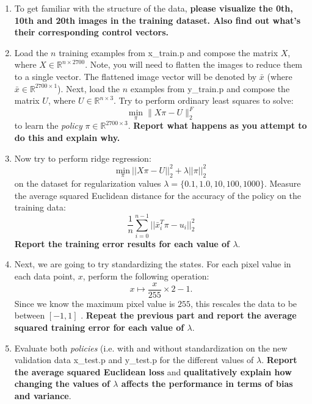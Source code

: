 \documentclass{article}\usepackage[utf8]{inputenc}\usepackage[margin=0.4cm,top=0.4cm,bottom=0.4cm]{geometry}\usepackage[usenames,dvipsnames,svgnames,table]{xcolor}
\begin{document}
\begin{enumerate}
\item To get familiar with the structure of the data, \textbf{please visualize the 0th, 10th and 20th images in the training dataset. Also find out what's their corresponding control vectors. }
\BeginSolution

\EndSolution
\item Load the $n$ training examples from x\_train.p and compose the matrix $X$, where $X \in \mathbb{R}^{n\times 2700}$. Note, you will need to flatten the images to reduce them to a single vector. The flattened image vector will be denoted by $\bar{x}$ (where $\bar{x} \in \mathbb{R}^{2700\times 1}$). Next, load the $n$ examples from y\_train.p and compose the matrix $U$, where $U \in \mathbb{R}^{n\times 3}$. Try to perform ordinary least squares to solve:  $$\min_{\pi} \|X\pi-U \|^F_2$$ to learn the \emph{policy} $\pi \in \mathbb{R}^{2700 \times 3}$. {\bf Report what happens as you attempt to do this and explain why.}
\BeginSolution

\EndSolution
\item Now try to perform ridge regression: $$\underset{\pi}{\mbox{min}} \: ||X\pi-U||^2_2 + \lambda ||\pi||^2_2$$ on the dataset for regularization values $\lambda = \lbrace 0.1,1.0,10,100,1000 \rbrace$. Measure the average squared Euclidean distance for the accuracy of the policy on the training data: $$\frac{1}{n}\sum_{i =0 }^{n-1} ||\bar{x}_i^T \pi - u_i||^2_2$$ {\bf Report the training error results for each value of $\lambda$}.
\BeginSolution

\EndSolution
\item Next, we are going to try standardizing the states. For each pixel value in each data point, $x$, perform the following operation: $$x \mapsto \frac{x}{255} \times 2 - 1.$$ Since we know the maximum pixel value is $255$, this rescales the data to be between $[-1,1]$ . {\bf Repeat the previous part and report the average squared training error for each value of $\lambda$}.
\BeginSolution

\EndSolution
\item Evaluate both \emph{policies} (i.e. with and without standardization on the new validation data x\_test.p and y\_test.p for the different values of $\lambda$. {\bf Report the average squared Euclidean loss} and {\bf qualitatively explain how changing the values of $\lambda$ affects the performance in terms of bias and variance}. 
\BeginSolution


\end{enumerate}
\end{document}
